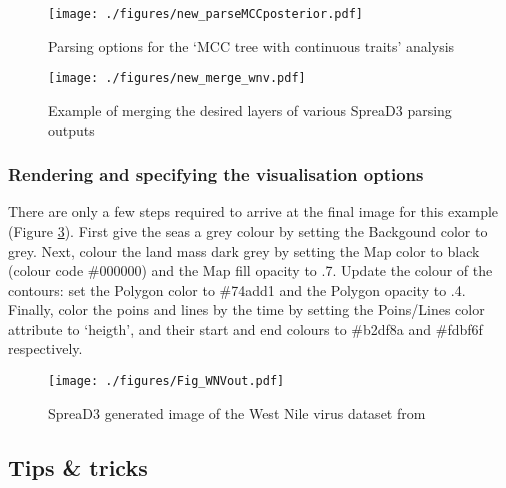 \documentclass[english]{paper}
\def \spreadname {SpreaD3}
\begin{document}
\begin{figure}%
\centering
\texttt{[image: ./figures/new\_parseMCCposterior.pdf]} 
\caption{Parsing options for the `MCC tree with continuous traits' analysis}
\label{fig:parsePosteriorMCC}
\end{figure}

\begin{figure}%
\centering
\texttt{[image: ./figures/new\_merge\_wnv.pdf]} 
\caption{Example of merging the desired layers of various {\spreadname} parsing outputs}
\label{fig:mergeTimeSlice}
\end{figure}


\subsubsection{Rendering and specifying the visualisation options}

There are only a few steps required to arrive at the final image for this example (Figure \ref{fig:TimeSliceFigure}).
First give the seas a grey colour by setting the Backgound color to grey.
Next, colour the land mass dark grey by setting the Map color to black (colour code \#000000) and the Map fill opacity to .7.
Update the colour of the contours: set the Polygon color  to \#74add1 and the Polygon opacity to .4.
Finally, color the poins and lines by the time by setting the Poins/Lines color attribute to `heigth', and their start and end colours to \#b2df8a and \#fdbf6f respectively.

\begin{figure}%
\centering
\texttt{[image: ./figures/Fig\_WNVout.pdf]} 
\caption{{\spreadname} generated image of the West Nile virus dataset from \citet{Pybus:2012aa}}
\label{fig:TimeSliceFigure}
\end{figure}


\subsection{Tips \& tricks\label{sub:tips}}

% 
\end{document}
